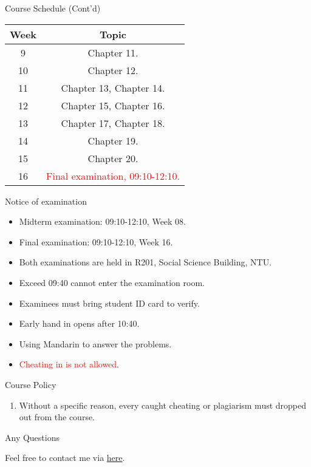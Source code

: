 \documentclass{beamer}
\begin{document}
\begin{frame}{Course Schedule (Cont'd)}
\begin{center}
\begin{tabular}{|c|c|}
\hline
Week & Topic \\
\hline
9 & Chapter 11.\\
\hline
10 & Chapter 12.\\
\hline
11 & Chapter 13, Chapter 14.\\
\hline
12 & Chapter 15, Chapter 16.\\
\hline
13 & Chapter 17, Chapter 18.\\
\hline
14 & Chapter 19.\\
\hline
15 & Chapter 20.\\
\hline
16 & \textcolor{red}{Final examination, 09:10-12:10.}\\
\hline
\end{tabular}
\end{center}
\end{frame}
\begin{frame}{Notice of examination}
    \begin{itemize}
    \pause
    \item Midterm examination: 09:10-12:10, Week 08.
    \pause
    \item Final examination: 09:10-12:10, Week 16.
    \pause
    \item Both examinations are held in R201, Social Science Building, NTU.
    \pause
    \item Exceed 09:40 cannot enter the examination room.
    \pause
    \item Examinees must bring student ID card to verify.
    \pause
    \item Early hand in opens after 10:40.
    \pause
    \item Using Mandarin to answer the problems.
    \pause
    \item \textcolor{red}{Cheating in is not allowed}.
    \end{itemize}
\end{frame}
\begin{frame}{Course Policy}
\begin{enumerate}
\pause
\item Without a specific reason, every caught cheating or plagiarism must dropped out from the course. \\
\end{enumerate}
\end{frame}
\begin{frame}{Any Questions}
\begin{center}
Feel free to contact me via \href{mailto:politics.tchsiao@gmail.com}{here}.
\end{center}
\end{frame}
\end{document}
